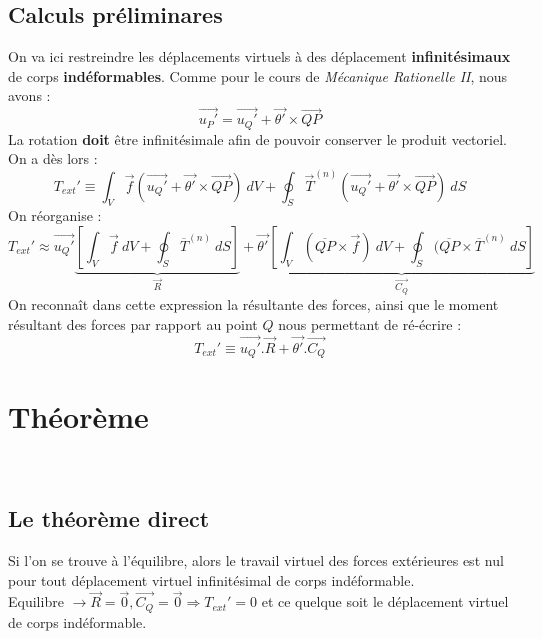 \subsection{Calculs préliminares}
On va ici restreindre les déplacements virtuels à des déplacement \textbf{
	infinitésimaux} de corps \textbf{indéformables}. Comme pour le cours de 
\textit{Mécanique Rationelle II}, nous avons :
\begin{equation}
	\vec{u_P'} = \vec{u_Q'} + \vec{\theta'}\times\vec{QP}
\end{equation}
La rotation \textbf{doit} être infinitésimale afin de pouvoir conserver le
produit vectoriel. On a dès lors :
\begin{equation}
	T_{ext}' \equiv \int_V \vec{f}(\vec{u_Q'} + \vec{\theta'}\times\vec{QP})\ dV
	+ \oint_S \vec{T}^{(n)}(\vec{u_Q'} + \vec{\theta'}\times\vec{QP})\ dS
\end{equation}	
On réorganise :
\begin{equation}
	T_{ext}' \approx \vec{u_Q'}\underbrace{\left[\int_V \vec{f}\ dV + \oint_S
			\overline{T}^{(n)}\ dS \right]}_{\vec{R}} + \vec{\theta'}\underbrace{\left[
			\int_V (\overline{QP}\times\vec{f})\ dV + \oint_S (\overline{QP}\times
		\overline{T}^{(n)}\ dS\right]}_{\vec{C_Q}}
\end{equation}
On reconnaît dans cette expression la résultante des forces, ainsi que le 
moment résultant des forces par rapport au point $Q$ nous permettant de 
ré-écrire :
\begin{equation}
	T_{ext}' \equiv \vec{u_Q'}.\vec{R} + \vec{\theta'}.\vec{C_Q}
\end{equation}
	

\section{Théorème}
\ 
	
\subsection{Le théorème direct}
Si l'on se trouve à l'équilibre, alors le travail virtuel des forces 
extérieures est nul pour tout déplacement virtuel infinitésimal de 
corps indéformable.\\
Equilibre $\rightarrow \vec{R}=\vec{0}, \vec{C_Q}=\vec{0} \Rightarrow T_{
	ext}' = 0$ et ce quelque soit le déplacement virtuel de corps indéformable.
	
